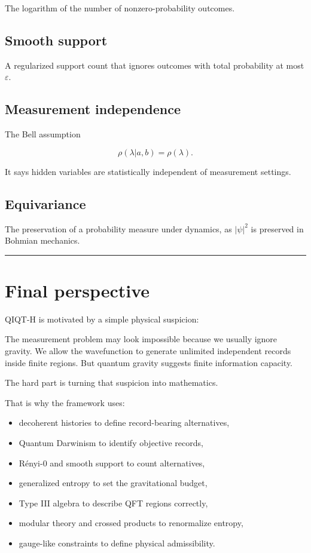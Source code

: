 \documentclass[11pt,a4paper]{article}
\newenvironment{qiqtquote}{\begin{mdframed}[style=quotestyle]}{\end{mdframed}}
\begin{document}
The logarithm of the number of nonzero-probability outcomes.

\subsection{Smooth support}

A regularized support count that ignores outcomes with total probability at most $\varepsilon$.

\subsection{Measurement independence}

The Bell assumption

\[
\rho(\lambda|a,b)=\rho(\lambda).
\]

It says hidden variables are statistically independent of measurement settings.

\subsection{Equivariance}

The preservation of a probability measure under dynamics, as $|\psi|^2$ is preserved in Bohmian mechanics.

\medskip\hrule\medskip

\section{Final perspective}

QIQT-H is motivated by a simple physical suspicion:

\begin{qiqtquote}
The measurement problem may look impossible because we usually ignore gravity. We allow the wavefunction to generate unlimited independent records inside finite regions. But quantum gravity suggests finite information capacity.
\end{qiqtquote}

The hard part is turning that suspicion into mathematics.

That is why the framework uses:

\begin{itemize}
  \item decoherent histories to define record-bearing alternatives,
  \item Quantum Darwinism to identify objective records,
  \item Rényi-0 and smooth support to count alternatives,
  \item generalized entropy to set the gravitational budget,
  \item Type III algebra to describe QFT regions correctly,
  \item modular theory and crossed products to renormalize entropy,
  \item gauge-like constraints to define physical admissibility.
\end{itemize}
\end{document}
